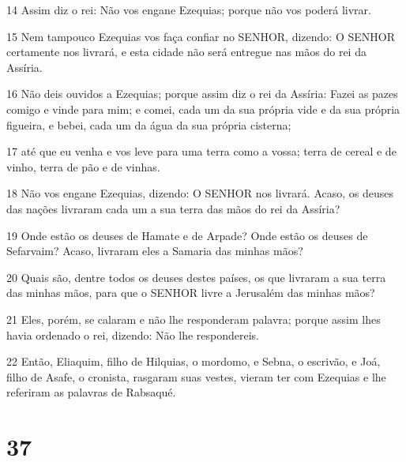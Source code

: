 \par 14 Assim diz o rei: Não vos engane Ezequias; porque não vos poderá livrar.
\par 15 Nem tampouco Ezequias vos faça confiar no SENHOR, dizendo: O SENHOR certamente nos livrará, e esta cidade não será entregue nas mãos do rei da Assíria.
\par 16 Não deis ouvidos a Ezequias; porque assim diz o rei da Assíria: Fazei as pazes comigo e vinde para mim; e comei, cada um da sua própria vide e da sua própria figueira, e bebei, cada um da água da sua própria cisterna;
\par 17 até que eu venha e vos leve para uma terra como a vossa; terra de cereal e de vinho, terra de pão e de vinhas.
\par 18 Não vos engane Ezequias, dizendo: O SENHOR nos livrará. Acaso, os deuses das nações livraram cada um a sua terra das mãos do rei da Assíria?
\par 19 Onde estão os deuses de Hamate e de Arpade? Onde estão os deuses de Sefarvaim? Acaso, livraram eles a Samaria das minhas mãos?
\par 20 Quais são, dentre todos os deuses destes países, os que livraram a sua terra das minhas mãos, para que o SENHOR livre a Jerusalém das minhas mãos?
\par 21 Eles, porém, se calaram e não lhe responderam palavra; porque assim lhes havia ordenado o rei, dizendo: Não lhe respondereis.
\par 22 Então, Eliaquim, filho de Hilquias, o mordomo, e Sebna, o escrivão, e Joá, filho de Asafe, o cronista, rasgaram suas vestes, vieram ter com Ezequias e lhe referiram as palavras de Rabsaqué.

\chapter{37}

